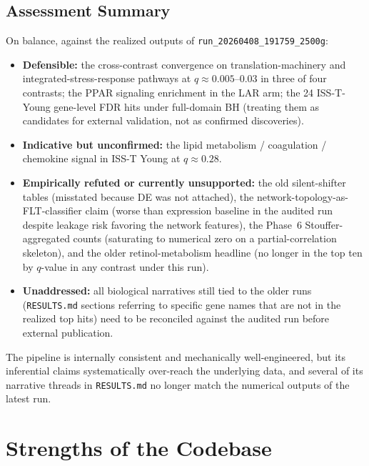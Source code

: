 \documentclass[11pt]{article}
\newcommand{\code}[1]{\texttt{#1}}
\begin{document}
\subsection{Assessment Summary}

On balance, against the realized outputs of \code{run\_20260408\_191759\_2500g}:
\begin{itemize}[leftmargin=*]
\item \textbf{Defensible:} the cross-contrast convergence on translation-machinery and integrated-stress-response pathways at $q\approx 0.005\text{--}0.03$ in three of four contrasts; the PPAR signaling enrichment in the LAR arm; the 24 ISS-T-Young gene-level FDR hits under full-domain BH (treating them as candidates for external validation, not as confirmed discoveries).
\item \textbf{Indicative but unconfirmed:} the lipid metabolism / coagulation / chemokine signal in ISS-T Young at $q\approx 0.28$.
\item \textbf{Empirically refuted or currently unsupported:} the old silent-shifter tables (misstated because DE was not attached), the network-topology-as-FLT-classifier claim (worse than expression baseline in the audited run despite leakage risk favoring the network features), the Phase~6 Stouffer-aggregated counts (saturating to numerical zero on a partial-correlation skeleton), and the older retinol-metabolism headline (no longer in the top ten by $q$-value in any contrast under this run).
\item \textbf{Unaddressed:} all biological narratives still tied to the older runs (\code{RESULTS.md} sections referring to specific gene names that are not in the realized top hits) need to be reconciled against the audited run before external publication.
\end{itemize}

The pipeline is internally consistent and mechanically well-engineered, but its inferential claims systematically over-reach the underlying data, and several of its narrative threads in \code{RESULTS.md} no longer match the numerical outputs of the latest run.

\section{Strengths of the Codebase}
\end{document}
